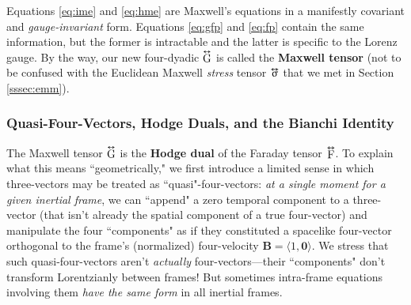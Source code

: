 \documentclass[12pt]{article}
\renewcommand{\vv}[1]{\mathbf{#1}}
\newcommand{\tightoverset}[2]{%
  \mathop{#2}\limits^{\vbox to -.5ex{\kern-0.75ex\hbox{$#1$}\vss}}}
\newcommand{\inlinedy}[1]{\tightoverset{\text{\tiny$\bm\leftrightarrow$}}{#1}}
\begin{document}
Equations \ref{eq:ime} and \ref{eq:hme} are Maxwell's equations in a manifestly covariant and \emph{gauge-invariant} form. Equations \ref{eq:gfp} and \ref{eq:fp} contain the same information, but the former is intractable and the latter is specific to the Lorenz gauge. By the way, our new four-dyadic $\inlinedy{\mathrm{G}}$ is called the \textbf{Maxwell tensor} (not to be confused with the Euclidean Maxwell \emph{stress} tensor $\inlinedy{\upsigma}$ that we met in Section \ref{sssec:emm}).


\subsubsection{Quasi-Four-Vectors, Hodge Duals, and the Bianchi Identity}\label{sssec:hd}

The Maxwell tensor $\inlinedy{\mathrm{G}}$ is the \textbf{Hodge dual} of the Faraday tensor $\inlinedy{\mathrm{F}}$. To explain what this means ``geometrically," we first introduce a limited sense in which three-vectors may be treated as ``quasi"-four-vectors: \emph{at a single moment for a given inertial frame}, we can ``append" a zero temporal component to a three-vector (that isn't already the spatial component of a true four-vector) and manipulate the four ``components" as if they constituted a spacelike four-vector orthogonal to the frame's (normalized) four-velocity $\vv B = \langle 1, \vv 0 \rangle$. We stress that such quasi-four-vectors aren't \emph{actually} four-vectors---their ``components" don't transform Lorentzianly between frames! But sometimes intra-frame equations involving them \emph{have the same form} in all inertial frames.
\end{document}
